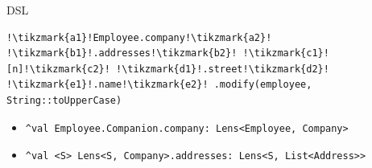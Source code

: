 \documentclass[xcolor={dvipsnames}]{beamer}
\begin{document}
\begin{frame}[fragile, t]{DSL}
    \begin{lstlisting}[escapechar=!]
!\tikzmark{a1}!Employee.company!\tikzmark{a2}! !\tikzmark{b1}!.addresses!\tikzmark{b2}! !\tikzmark{c1}![n]!\tikzmark{c2}! !\tikzmark{d1}!.street!\tikzmark{d2}! !\tikzmark{e1}!.name!\tikzmark{e2}! .modify(employee, String::toUpperCase)
    \end{lstlisting}
    
    
    \newenvironment{redenv}{\only{\setbeamercolor{local structure}{fg=red}}}{}
    \newenvironment{greenenv}{\only{\setbeamercolor{local structure}{fg=ForestGreen}}}{}
    \newenvironment{blueenv}{\only{\setbeamercolor{local structure}{fg=blue}}}{}
    \newenvironment{grayenv}{\only{\setbeamercolor{local structure}{fg=gray}}}{}
    \newenvironment{purpleenv}{\only{\setbeamercolor{local structure}{fg=purple}}}{}
    
    \begin{itemize}
        \item<red@1->
            \begin{lstlisting}
^val Employee.Companion.company: Lens<Employee, Company>
            \end{lstlisting}


        \item<green@1->
            \begin{lstlisting}
^val <S> Lens<S, Company>.addresses: Lens<S, List<Address>>
            \end{lstlisting}



\end{itemize}
\end{frame}
\end{document}
